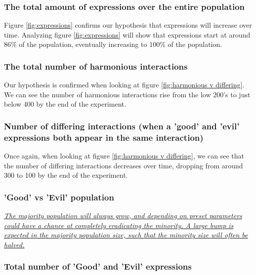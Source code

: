 \documentclass[]{article}
\begin{document}
\subsubsection{The total amount of expressions over the entire population} 

Figure \ref{fig:expressions} confirms our hypothesis that expressions will increase over time. Analyzing figure \ref{fig:expressions} will show that expressions start at around 86\% of the population, eventually increasing to 100\% of the population. 


\subsubsection{The total number of harmonious interactions}

Our hypothesis is confirmed when looking at figure \ref{fig:harmonious v differing}. We can see the number of harmonious interactions rise from the low 200's to just below 400 by the end of the experiment.



\subsubsection{Number of differing interactions (when a 'good' and 'evil' expressions both appear in the same interaction)} Once again, when looking at figure \ref{fig:harmonious v differing}, we can see that the number of differing interactions decreases over time, dropping from around 300 to 100 by the end of the experiment. 



\subsubsection{'Good' vs 'Evil' population} \underline{\textit{The majority population will always grow, and depending on preset parameters could have a chance at completely eradicating the minority. A large bump is expected in the majority population size, such that the minority size will often be halved. }}

\subsubsection{Total number of 'Good' and 'Evil' expressions} 
\end{document}
